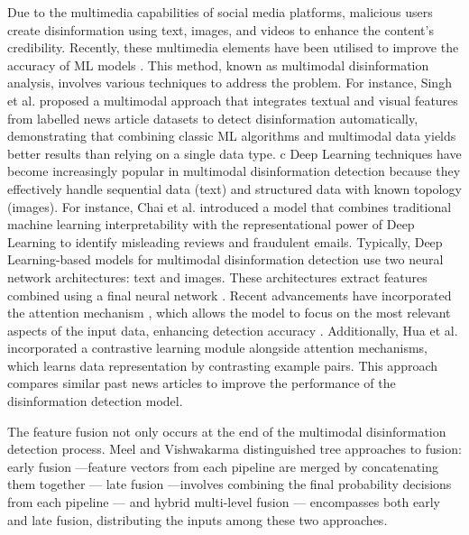 Due to the multimedia capabilities of social media platforms, malicious users create disinformation using text, images, and videos to enhance the content's credibility. Recently, these multimedia elements have been utilised to improve the accuracy of ML models \cite{Hangloo2022}. This method, known as multimodal disinformation analysis, involves various techniques to address the problem. For instance, Singh et al. \cite{singh2021} proposed a multimodal approach that integrates textual and visual features from labelled news article datasets to detect disinformation automatically, demonstrating that combining classic ML algorithms and multimodal data yields better results than relying on a single data type.
 c
Deep Learning techniques have become increasingly popular in multimodal disinformation detection because they effectively handle sequential data (text) and structured data with known topology (images). For instance, Chai et al. \cite{CHAI2024121588} introduced a model that combines traditional machine learning interpretability with the representational power of Deep Learning to identify misleading reviews and fraudulent emails. Typically, Deep Learning-based models for multimodal disinformation detection use two neural network architectures: text and images. These architectures extract features combined using a final neural network \cite{Sengan2023, Jing2023, Ghorbanpour2023}. Recent advancements have incorporated the attention mechanism \cite{Guo2023}, which allows the model to focus on the most relevant aspects of the input data, enhancing detection accuracy \cite{Yadav2023}. Additionally, Hua et al. \cite{Hua2023} incorporated a contrastive learning module alongside attention mechanisms, which learns data representation by contrasting example pairs. This approach compares similar past news articles to improve the performance of the disinformation detection model.

The feature fusion not only occurs at the end of the multimodal disinformation detection process. Meel and Vishwakarma \cite{Meel2023} distinguished tree approaches to fusion: early fusion ---feature vectors from each pipeline are merged by concatenating them together \cite{Xiong2023}--- late fusion ---involves combining the final probability decisions from each pipeline \cite{Singh2023}--- and hybrid multi-level fusion  --- encompasses both early and late fusion, distributing the inputs among these two approaches. 

